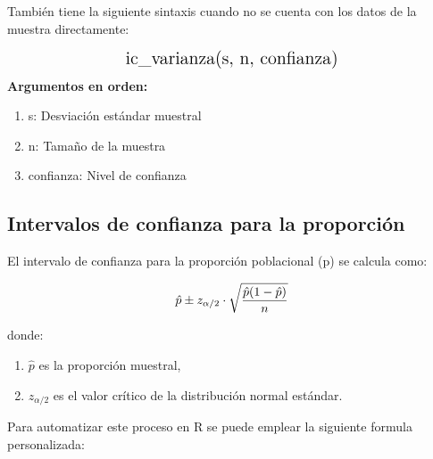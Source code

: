 \documentclass[
  spanish,
  letterpaper,
]{book}
\begin{document}
También tiene la siguiente sintaxis cuando no se cuenta con los datos de
la muestra directamente:

\[
\Large \text{ic\_varianza(s, n, confianza)}
\] \textbf{Argumentos en orden:}

\begin{enumerate}
\def\labelenumi{\arabic{enumi}.}
\item
  s: Desviación estándar muestral
\item
  n: Tamaño de la muestra
\item
  confianza: Nivel de confianza
\end{enumerate}

\subsection{Intervalos de confianza para la
proporción}\label{intervalos-de-confianza-para-la-proporciuxf3n}

El intervalo de confianza para la proporción poblacional (p) se calcula
como:

\[\LARGE \hat{p} \pm z_{\alpha/2} \cdot \sqrt{\frac{\hat{p}(1-\hat{p})}{n}} \]\hspace{0pt}

donde:

\begin{enumerate}
\def\labelenumi{\arabic{enumi}.}
\item
  \(\hat{p}\) es la proporción muestral,
\item
  \(z_{\alpha/2}\) es el valor crítico de la distribución normal
  estándar.
\end{enumerate}

Para automatizar este proceso en R se puede emplear la siguiente formula
personalizada:
\end{document}
